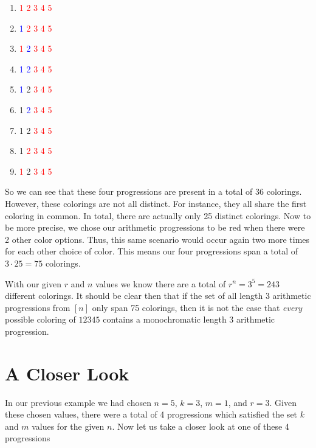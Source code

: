 \documentclass[12pt, a4paper]{article}
\begin{document}
\begin{multicols}{3}
\begin{enumerate}
    \item \textcolor{red}{1 2 3 4 5}
    \item \textcolor{blue}{1 }\textcolor{red}{2 3 4 5}
    \item \textcolor{red}{1 }\textcolor{blue}{2 }\textcolor{red}{3 4 5}
    \item \textcolor{blue}{1 2 }\textcolor{red}{3 4 5} 
    \item \textcolor{blue}{1 }2 \textcolor{red}{3 4 5} 
    \item 1 \textcolor{blue}{2 }\textcolor{red}{3 4 5} 
    \item 1 2 \textcolor{red}{3 4 5} 
    \item 1 \textcolor{red}{2 3 4 5}
    \item \textcolor{red}{1 }2 \textcolor{red}{3 4 5}
\end{enumerate}
\end{multicols}

\newpage

\noindent So we can see that these four progressions are present in a total of 36 colorings. However, these colorings are not all distinct. For instance, they all share the first coloring in common. In total, there are actually only 25 distinct colorings. Now to be more precise, we chose our arithmetic progressions to be red when there were 2 other color options. Thus, this same scenario would occur again two more times for each other choice of color. This means our four progressions span a total of $3\cdot 25= 75$ colorings.\par
With our given $r$ and $n$ values we know there are a total of $r^n=3^5=243$ different colorings. It should be clear then that if the set of all length 3 arithmetic progressions from $[n]$ only span 75 colorings, then it is not the case that \textit{every} possible coloring of $12345$ contains a monochromatic length 3 arithmetic progression. 

\section{A Closer Look}

In our previous example we had chosen $n=5$, $k=3$, $m=1$, and $r=3$. Given these chosen values, there were a total of 4 progressions which satisfied the set $k$ and $m$ values for the given $n$. Now let us take a closer look at one of these 4 progressions
\end{document}
